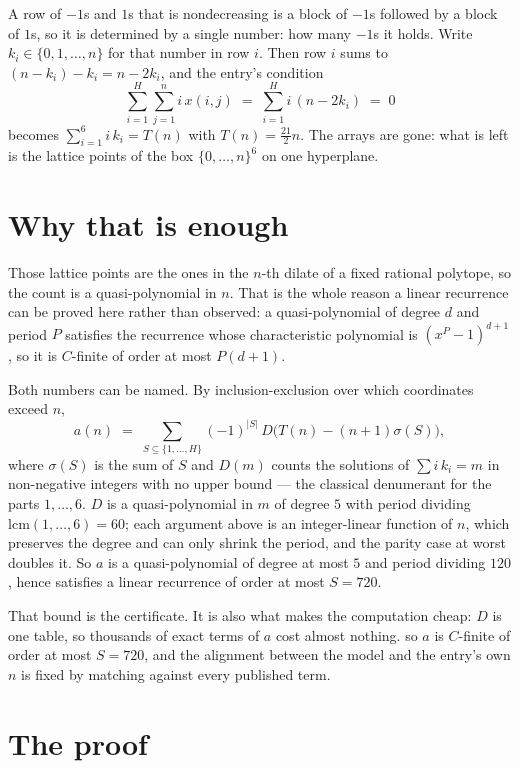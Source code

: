 \documentclass[11pt,a4paper]{article}
\theoremstyle{plain}
\theoremstyle{definition}
\begin{document}
A row of $-1$s and $1$s that is nondecreasing is a block of $-1$s followed by a block of $1$s, so it is determined by a single number: how many $-1$s it holds. Write $k_i\in\{0,1,\dots,n\}$ for that number in row $i$. Then row $i$ sums to $(n-k_i)-k_i = n-2k_i$, and the entry's condition
\[ \sum_{i=1}^{H}\sum_{j=1}^{n} i\,x(i,j) \;=\; \sum_{i=1}^{H} i\,(n-2k_i) \;=\; 0 \]
becomes $\sum_{i=1}^{6} i\,k_i = T(n)$ with $T(n)=\tfrac{21}{2}n$. The arrays are gone: what is left is the lattice points of the box $\{0,\dots,n\}^{6}$ on one hyperplane.

\section{Why that is enough}

Those lattice points are the ones in the $n$-th dilate of a fixed rational polytope, so the count is a quasi-polynomial in $n$. That is the whole reason a linear recurrence can be proved here rather than observed: a quasi-polynomial of degree $d$ and period $P$ satisfies the recurrence whose characteristic polynomial is $(x^{P}-1)^{d+1}$, so it is $C$-finite of order at most $P(d+1)$.

Both numbers can be named. By inclusion-exclusion over which coordinates exceed $n$,
\[ a(n)\;=\;\sum_{S\subseteq\{1,\dots,H\}}(-1)^{|S|}\,D\bigl(T(n)-(n+1)\sigma(S)\bigr), \]
where $\sigma(S)$ is the sum of $S$ and $D(m)$ counts the solutions of $\sum i\,k_i=m$ in non-negative integers with no upper bound --- the classical denumerant for the parts $1,\dots,6$. $D$ is a quasi-polynomial in $m$ of degree $5$ with period dividing $\mathrm{lcm}(1,\dots,6)=60$; each argument above is an integer-linear function of $n$, which preserves the degree and can only shrink the period, and the parity case at worst doubles it. So $a$ is a quasi-polynomial of degree at most $5$ and period dividing $120$, hence satisfies a linear recurrence of order at most $S=720$.

That bound is the certificate. It is also what makes the computation cheap: $D$ is one table, so thousands of exact terms of $a$ cost almost nothing.
so $a$ is $C$-finite of order at most $S=720$, and the alignment between the model and the
entry's own $n$ is fixed by matching against every published term.

\section{The proof}
\end{document}
